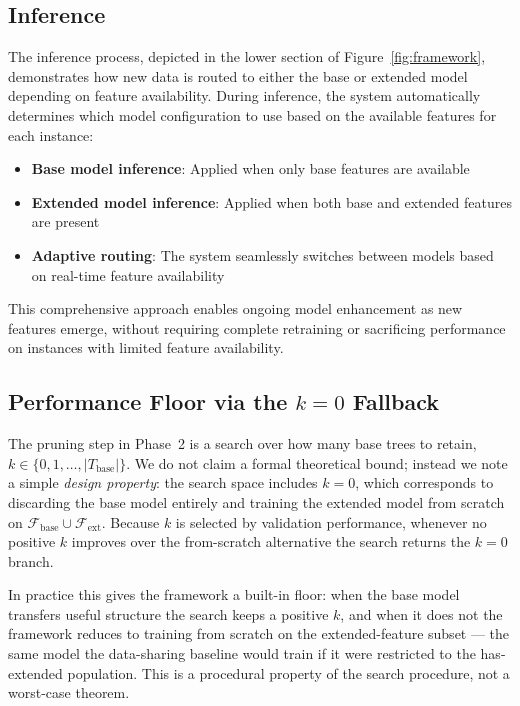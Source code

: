 \documentclass[sigconf]{acmart}
\begin{document}
\begin{itemize}
\subsection{Inference}

The inference process, depicted in the lower section of Figure~\ref{fig:framework}, demonstrates how new data is routed to either the base or extended model depending on feature availability. During inference, the system automatically determines which model configuration to use based on the available features for each instance:

\begin{itemize}
\item \textbf{Base model inference}: Applied when only base features are available
\item \textbf{Extended model inference}: Applied when both base and extended features are present
\item \textbf{Adaptive routing}: The system seamlessly switches between models based on real-time feature availability
\end{itemize}

This comprehensive approach enables ongoing model enhancement as new features emerge, without requiring complete retraining or sacrificing performance on instances with limited feature availability.

\subsection{Performance Floor via the $k=0$ Fallback}
\label{sec:k0-fallback}

The pruning step in Phase~2 is a search over how many base trees to retain, $k \in \{0, 1, \ldots, |T_{\text{base}}|\}$. We do not claim a formal theoretical bound; instead we note a simple \emph{design property}: the search space includes $k=0$, which corresponds to discarding the base model entirely and training the extended model from scratch on $\mathcal{F}_{\text{base}}\cup\mathcal{F}_{\text{ext}}$. Because $k$ is selected by validation performance, whenever no positive $k$ improves over the from-scratch alternative the search returns the $k=0$ branch.

In practice this gives the framework a built-in floor: when the base model transfers useful structure the search keeps a positive $k$, and when it does not the framework reduces to training from scratch on the extended-feature subset --- the same model the data-sharing baseline would train if it were restricted to the has-extended population. This is a procedural property of the search procedure, not a worst-case theorem.


\end{itemize}
\end{document}
